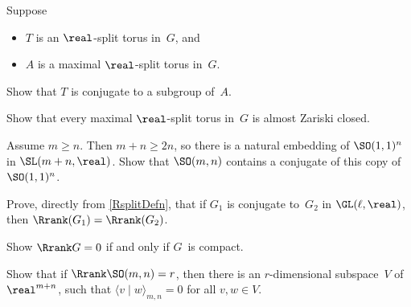\begin{exercises}

\item Suppose
	\begin{itemize}
	\item $T$ is an $\real$-split torus in~$G$,
	and
	\item $A$ is a maximal $\real$-split torus in~$G$.
	\end{itemize}
Show that $T$ is conjugate to a subgroup of~$A$.

\item \label{MaxRsplitZar}
Show that every maximal $\real$-split torus in~$G$ is almost Zariski closed.

\item \label{SO11inSOmn}
Assume $m \ge n$. Then $m + n \ge 2n$, so there is a natural embedding of $\SO(1,1)^n$ in $\SL(m+n,\real)$.
Show that $\SO(m,n)$ contains a conjugate of this copy of $\SO(1,1)^n$.

\item Prove, directly from \cref{RsplitDefn}, that if
$G_1$ is conjugate to~$G_2$ in $\GL(\ell,\real)$, then
$\Rrank(G_1) = \Rrank(G_2)$.

\item \label{Rrank0Ex}
Show $\Rrank G = 0$ if and only if $G$~is compact.

\item \label{SOmnIsotopic}
Show that if $\Rrank \SO(m,n) = r$, then there is an $r$-dimensional subspace~$V$ of~$\real^{m+n}$, such that $\langle v \mid w \rangle_{m,n} = 0$ for all $v,w \in V$.


\end{exercises}
